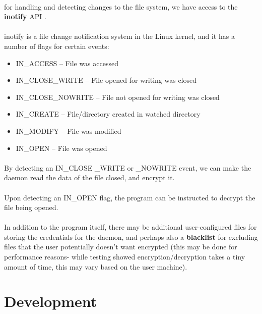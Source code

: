\documentclass{article}
\begin{document}
    \paragraph{}for handling and detecting changes to the file system, we have access to the \textbf{inotify} API \parencite{inotify_manpage}.
    \paragraph{}inotify is a file change notification system in the Linux kernel, and it has a number of flags for certain events:
    \begin{itemize}
        \item IN\_ACCESS – File was accessed
        \item IN\_CLOSE\_WRITE – File opened for writing was closed
        \item IN\_CLOSE\_NOWRITE – File not opened for writing was closed
        \item IN\_CREATE – File/directory created in watched directory
        \item IN\_MODIFY – File was modified
        \item IN\_OPEN – File was opened
    \end{itemize}
    \paragraph{}By detecting an IN\_CLOSE \_WRITE or \_NOWRITE event, we can make the daemon read the data of the file closed, and encrypt it.
    \paragraph{}Upon detecting an IN\_OPEN flag, the program can be instructed to decrypt the file being opened.
    \paragraph{}In addition to the program itself, there may be additional user-configured files for storing the credentials for the daemon, and perhaps also a \textbf{blacklist} for excluding files that the user potentially doesn't want encrypted (this may be done for performance reasons- while testing showed encryption/decryption takes a tiny amount of time, this may vary based on the user machine).

\section{Development}
\end{document}
